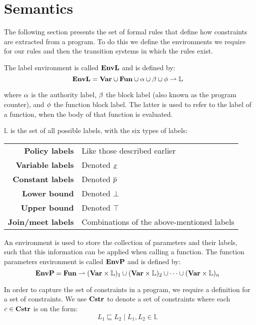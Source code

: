 \section{Semantics}
The following section presents the set of formal rules that define how constraints are extracted from a program.
To do this we define the environments we require for our rules and then the transition systems in which the rules exist.

The label environment is called $\mathbf{EnvL}$ and is defined by:
\[
  \mathbf{EnvL} = \mathbf{Var} \cup \mathbf{Fun} \cup \alpha \cup \beta \cup \phi \rightharpoonup \mathbb{L}
\]

where $\alpha$ is the authority label, $\beta$ the block label (also known as the program counter), and $\phi$ the function block label.
The latter is used to refer to the label of a function, when the body of that function is evaluated.

$\mathbb{L}$ is the set of all possible labels, with the six types of labels: \\

\begin{tabular}{rl}
  \textbf{Policy labels}    & Like those described earlier \\
  \textbf{Variable labels}  & Denoted $\underline{x}$ \\
  \textbf{Constant labels}  & Denoted $\overline{p}$ \\
  \textbf{Lower bound}      & Denoted $\bot$ \\
  \textbf{Upper bound}      & Denoted $\top$ \\
  \textbf{Join/meet labels} & Combinations of the above-mentioned labels
\end{tabular}

An environment is used to store the collection of parameters and their labels, such that this information can be applied when calling a function.
The function parameters environment is called $\mathbf{EnvP}$ and is defined by:
\[
  \mathbf{EnvP} = \mathbf{Fun} \rightharpoonup (\mathbf{Var} \times \mathbb{L})_1 \cup (\mathbf{Var} \times \mathbb{L})_2 \cup \dots \cup (\mathbf{Var} \times \mathbb{L})_n
\]

In order to capture the set of constraints in a program, we require a definition for a set of constraints.
We use $\mathbf{Cstr}$ to denote a set of constraints where each $c \in \mathbf{Cstr}$ is on the form:
\[ L_1 \sqsubseteq L_2 \; | \; L_1, L_2 \in \mathbb{L} \]

